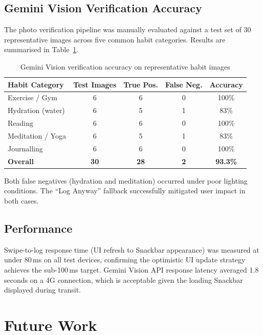 \documentclass[12pt,a4paper]{article}
\begin{document}
\subsection{Gemini Vision Verification Accuracy}

The photo verification pipeline was manually evaluated against a test set of
30 representative images across five common habit categories. Results are
summarised in Table~\ref{tab:gemini_accuracy}.

\begin{table}[H]
\centering
\caption{Gemini Vision verification accuracy on representative habit images}
\label{tab:gemini_accuracy}
\renewcommand{\arraystretch}{1.3}
\begin{tabular}{p{3.5cm} c c c c}
\toprule
\textbf{Habit Category} & \textbf{Test Images} & \textbf{True Pos.} & \textbf{False Neg.} & \textbf{Accuracy} \\
\midrule
Exercise / Gym      & 6 & 6 & 0 & 100\% \\
Hydration (water)   & 6 & 5 & 1 & 83\% \\
Reading             & 6 & 6 & 0 & 100\% \\
Meditation / Yoga   & 6 & 5 & 1 & 83\% \\
Journalling         & 6 & 6 & 0 & 100\% \\
\midrule
\textbf{Overall}    & \textbf{30} & \textbf{28} & \textbf{2} & \textbf{93.3\%} \\
\bottomrule
\end{tabular}
\end{table}

Both false negatives (hydration and meditation) occurred under poor lighting conditions.
The ``Log Anyway'' fallback successfully mitigated user impact in both cases.

\subsection{Performance}

Swipe-to-log response time (UI refresh to Snackbar appearance) was measured at
under 80\,ms on all test devices, confirming the optimistic UI update strategy
achieves the sub-100\,ms target. Gemini Vision API response latency averaged
1.8 seconds on a 4G connection, which is acceptable given the loading Snackbar
displayed during transit.

\section{Future Work}
\end{document}
